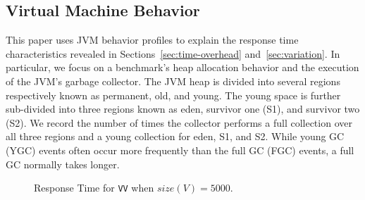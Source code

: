 \documentclass{sig-alternate}
\begin{document}




\subsection{Virtual Machine Behavior}
\label{sec:virt-mach-behav}


This paper uses JVM behavior profiles to explain the response time
characteristics revealed in Sections~\ref{sec:time-overhead}
and~\ref{sec:variation}.  In particular, we focus on a benchmark's
heap allocation behavior and the execution of the JVM's garbage
collector.  The JVM heap is divided into several regions respectively
known as permanent, old, and young.  The young space is further
sub-divided into three regions known as eden, survivor one (S1), and
survivor two (S2).  We record the number of times the collector
performs a full collection over all three regions and a young
collection for eden, S1, and S2.  While young GC (YGC) events often
occur more frequently than the full GC (FGC) events, a full GC
normally takes longer.

\begin{figure}[t]
\centering
{}
\vspace*{-.1in}
\caption{Response Time for {\tt VV} when $size(V)=5000$.}
\label{fig:ecdf}
\vspace*{-.1in}
\end{figure}


\end{document}
